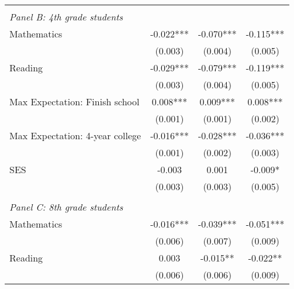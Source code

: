 {\begin{tabular}{lccc}
&  &  &   \\
\multicolumn{4}{l}{\textit{Panel B: 4th grade students}} \\
\hspace{3mm}Mathematics&      -0.022***&      -0.070***&      -0.115***\\
                    &     (0.003)   &     (0.004)   &     (0.005)   \\
 
\hspace{3mm}Reading &      -0.029***&      -0.079***&      -0.119***\\
                    &     (0.003)   &     (0.004)   &     (0.005)   \\
 
\hspace{3mm}Max Expectation: Finish school&       0.008***&       0.009***&       0.008***\\
                    &     (0.001)   &     (0.001)   &     (0.002)   \\
 
\hspace{3mm}Max Expectation: 4-year college&      -0.016***&      -0.028***&      -0.036***\\
                    &     (0.001)   &     (0.002)   &     (0.003)   \\
 
\hspace{3mm}SES     &      -0.003   &       0.001   &      -0.009*  \\
                    &     (0.003)   &     (0.003)   &     (0.005)   \\
 
&  &  &   \\
\multicolumn{4}{l}{\textit{Panel C: 8th grade students}} \\
\hspace{3mm}Mathematics&      -0.016***&      -0.039***&      -0.051***\\
                    &     (0.006)   &     (0.007)   &     (0.009)   \\
 
\hspace{3mm}Reading &       0.003   &      -0.015** &      -0.022** \\
                    &     (0.006)   &     (0.006)   &     (0.009)   \\
 

\end{tabular}}
